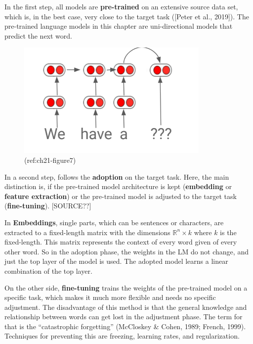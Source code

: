 \documentclass[]{krantz}
\begin{document}
In the first step, all models are \textbf{pre-trained} on an extensive source data set, which is, in the best case, very close to the target task ({[}Peter et al., 2019{]}). The pre-trained language models in this chapter are uni-directional models that predict the next word.

\begin{figure}

{\centering \includegraphics[width=0.8\linewidth]{figures/02-01-transfer-learning-for-nlp-1/pretrained-lm} 

}

\caption{(ref:ch21-figure7)}\label{fig:ch21-figure07}
\end{figure}

In a second step, follows the \textbf{adoption} on the target task. Here, the main distinction is, if the pre-trained model architecture is kept (\textbf{embedding} or \textbf{feature extraction}) or the pre-trained model is adjusted to the target task (\textbf{fine-tuning}). {[}SOURCE??{]}

In \textbf{Embeddings}, single parts, which can be sentences or characters, are extracted to a fixed-length matrix with the dimensions \(\mathbb{R}^{n} \times k\) where \(k\) is the fixed-length. This matrix represents the context of every word given of every other word. So in the adoption phase, the weights in the LM do not change, and just the top layer of the model is used. The adopted model learns a linear combination of the top layer.

On the other side, \textbf{fine-tuning} trains the weights of the pre-trained model on a specific task, which makes it much more flexible and needs no specific adjustment. The disadvantage of this method is that the general knowledge and relationship between words can get lost in the adjustment phase. The term for that is the ``catastrophic forgetting'' (McCloskey \& Cohen, 1989; French, 1999). Techniques for preventing this are freezing, learning rates, and regularization.
\end{document}
